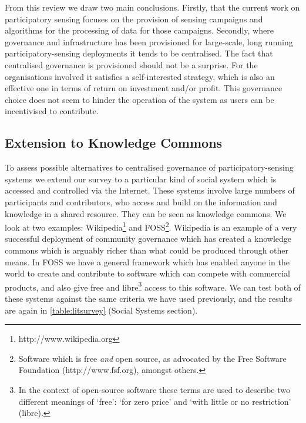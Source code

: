 

From this review we draw two main conclusions. Firstly, that the current work on participatory sensing focuses on the provision of sensing campaigns and algorithms for the processing of data for those campaigns. Secondly, where governance and infrastructure has been provisioned for large-scale, long running participatory-sensing deployments it tends to be centralised. The fact that centralised governance is provisioned should not be a surprise. 
For the organisations involved it satisfies a self-interested strategy, which is also an effective one in terms of return on investment and/or profit. 
This governance choice does not seem to hinder the operation of the system as users can be incentivised to contribute.

\subsection{Extension to Knowledge Commons}

To assess possible alternatives to centralised governance of participatory-sensing systems we extend our survey to a particular kind of social system which is accessed and controlled via the Internet. 
These systems involve large numbers of participants and contributors, who access and build on the information and knowledge in a shared resource. They can be seen as knowledge commons. We look at two examples: Wikipedia\footnote{http://www.wikipedia.org} and \ac{FOSS}\footnote{Software which is free \emph{and} open source, as advocated by the Free Software Foundation (http://www.fsf.org), amongst others.}. Wikipedia is an example of a very successful deployment of community governance which has created a knowledge commons which is arguably richer than what could be produced through other means. 
In \ac{FOSS} we have a general framework which has enabled anyone in the world to create and contribute to software which can compete with commercial products, and also give free and libre\footnote{In the context of open-source software these terms are used to describe two different meanings of `free': `for zero price' and `with little or no restriction' (libre).} access to this software. 
We can test both of these systems against the same criteria we have used previously, and the results are again in \autoref{table:litsurvey} (Social Systems section).

